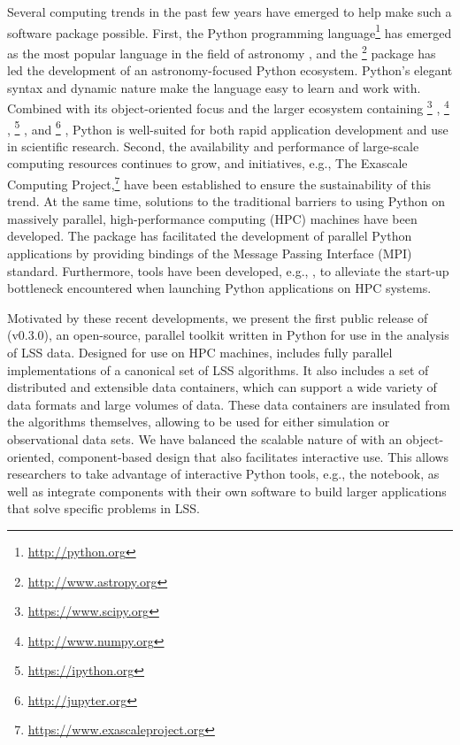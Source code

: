 Several computing trends in the past few years have emerged to help
make such a software package possible. First, the Python programming
language\footnote{\url{http://python.org}} has emerged as the most popular
language in the field of astronomy \citep{Momcheva:2015, NSF:2017}, and the
\astropy{}\footnote{\url{http://www.astropy.org}} package
\citep{Astropy:2013} has led the development of an
astronomy-focused Python ecosystem. Python's elegant syntax and dynamic
nature make the language easy to learn and work with.
Combined with its object-oriented focus and the larger ecosystem
containing \scipy\footnote{\url{https://www.scipy.org}} \citep{Jones:2001},
\numpy{}\footnote{\url{http://www.numpy.org}} \citep{NumPy:2011},
\ipython{}\footnote{\url{https://ipython.org}} \citep{Perez:2007},
and \jupyter{}\footnote{\url{http://jupyter.org}} \citep{Thomas:2016},
Python is well-suited for both
rapid application development and use in scientific research.
Second, the availability and performance of large-scale computing resources
continues to grow, and initiatives, e.g.,
The Exascale Computing Project,\footnote{\url{https://www.exascaleproject.org}}
have been established to ensure the sustainability of this trend.
At the same time, solutions to the
traditional barriers to using Python on massively parallel,
high-performance computing (HPC) machines have been developed. The
\mpipy{} package \citep{Dalcin:2008, Dalcin:2011} has facilitated the
development of parallel Python applications by providing bindings of
the Message Passing Interface (MPI) standard. Furthermore, tools have
been developed, e.g., \citet{Feng:2016}, to alleviate the start-up
bottleneck encountered when launching Python applications on HPC systems.

Motivated by these recent developments, we present the first
public release of \nbkit{} (v0.3.0), an open-source, parallel toolkit
written in Python for use in the analysis of LSS data. Designed for use
on HPC machines, \nbkit{} includes fully parallel implementations
of a canonical set of LSS algorithms. It also includes a set of
distributed and extensible data containers, which can support
a wide variety of data formats and large volumes of data.
These data containers are insulated from the algorithms themselves, allowing
\nbkit{} to be used for either simulation or observational data sets.
We have balanced the scalable nature of \nbkit{} with an object-oriented,
component-based design that also facilitates interactive use.
This allows researchers to take advantage of interactive Python tools,
e.g., the \jupyter{} notebook, as well as integrate \nbkit{} components
with their own software to build larger applications that solve specific
problems in LSS.



